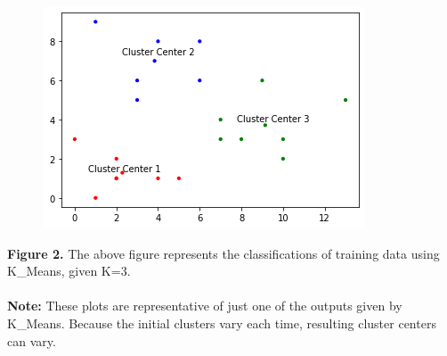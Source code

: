 \documentclass[11pt]{article}
\theoremstyle{definition}
\begin{document}
\begin{figure}[hbt!]
 \centering
 \includegraphics[scale=0.90]{Clustering_plot2}
\end{figure}
\textbf{Figure 2.} The above figure represents the classifications of training data using \textsf{K\_Means}, given K=3. 
\\
\\
\textbf{Note:} These plots are representative of just one of the outputs given by \textsf{K\_Means}. Because the initial clusters vary each time, resulting cluster centers can vary.
\end{document}
